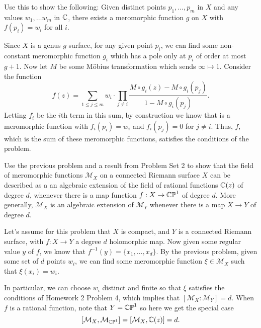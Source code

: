 \documentclass[expanded]{lkx_pset}
\begin{document}
\begin{parts}
	\begin{part}{}
		Use this to show the following: Given
		distinct points $p_{1},\dots, p_{m}$ in $X$ and any values
		$w_{1},\dots w_{m}$ in $\mathbb{C}$, there exists a meromorphic function $g$
		on $X$ with $f(p_{i})=w_{i}$ for all $i$.
	\end{part}

	Since $X$ is a genus $g$ surface, for any given point $p_i$, we can find some non-constant meromorphic function $g_i$ which has a pole only at $p_i$ of order at most $g+1$. Now let $M$ be some M\"obius transformation which sends $\infty \mapsto 1$. Consider the function
	\[
		f(z) = \sum_{1\leq j \leq m} w_i\cdot \prod_{j\neq i} \frac{M\circ g_i(z)- M\circ g_i(p_j)}{1-M\circ g_i(p_j)}.
	\]
	Letting $f_i$ be the $i$th term in this sum, by construction we know that is a meromorphic function with $f_i(p_i)=w_i$ and $f_i(p_j)=0$ for $j\neq i$. Thus, $f$, which is the sum of these meromorphic functions, satisfies the conditions of the problem.
\end{parts}

\begin{problem}{3}
Use the previous problem and a result from Problem Set 2 to show that
the field of meromorphic functions $\mathcal{M}_{X}$ on a connected
Riemann surface $X$ can be described as a an algebraic extension of
the field of rational functions $\mathbb{C}(z)$ of degree  $d$,
whenever there is a map function $f:X\to \mathbb{CP}^{1}$ of degree $d$.
More generally, $\mathcal{M}_{X}$ is an algebraic extension of
$\mathcal{M}_{Y}$ whenever there is a map $X\to Y$ of degree $d$.
\end{problem}

\begin{solution}
	Let's assume for this problem that $X$ is compact, and $Y$ is a connected Riemann surface, with $f : X \to Y$ a degree $d$ holomorphic map. Now given some regular value $y$ of $f$, we know that $f^{-1}(y) = \{x_1, \ldots, x_d\}$. By the previous problem, given some set of $d$ points $w_i$, we can find some meromorphic function $\xi \in \mathcal{M}_X$ such that $\xi(x_i)=w_i$.

	In particular, we can choose $w_i$ distinct and finite so that $\xi$ satisfies the conditions of Homework 2 Problem 4, which implies that $[\mathcal{M}_X : \mathcal{M}_Y] = d$. When $f$ is a rational function, note that $Y=\mathbb{CP}^1$ so here we get the special case
	\[
		[\mathcal{M}_X, \mathcal{M}_{\mathbb{CP}^1}] = [\mathcal{M}_X, \mathbb{C}(z)] = d.
	\]
\end{solution}
\end{document}
